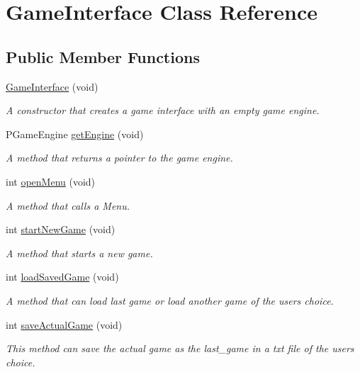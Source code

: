 \hypertarget{classGameInterface}{}\section{Game\+Interface Class Reference}
\label{classGameInterface}
\subsection*{Public Member Functions}
\begin{DoxyCompactItemize}
\item 
\hyperlink{classGameInterface_ad0748386476db5289c6965ac34cb93e5}{Game\+Interface} (void)
\begin{DoxyCompactList}\small\item\em A constructor that creates a game interface with an empty game engine. \end{DoxyCompactList}\item 
P\+Game\+Engine \hyperlink{classGameInterface_a0d60098b2f94bb20efb20196904dc30b}{get\+Engine} (void)
\begin{DoxyCompactList}\small\item\em A method that returns a pointer to the game engine. \end{DoxyCompactList}\item 
int \hyperlink{classGameInterface_a19dc01c2f82f5140e56980f5c02a8f55}{open\+Menu} (void)
\begin{DoxyCompactList}\small\item\em A method that calls a Menu. \end{DoxyCompactList}\item 
int \hyperlink{classGameInterface_a8a65a71277e660b053441c6bccdd21b9}{start\+New\+Game} (void)
\begin{DoxyCompactList}\small\item\em A method that starts a new game. \end{DoxyCompactList}\item 
int \hyperlink{classGameInterface_a1fe1e9abc88b994338f22202dae74a29}{load\+Saved\+Game} (void)
\begin{DoxyCompactList}\small\item\em A method that can load last game or load another game of the user\textquotesingle{}s choice. \end{DoxyCompactList}\item 
int \hyperlink{classGameInterface_ae069b22415177addad2bd7999b9eb2d9}{save\+Actual\+Game} (void)
\begin{DoxyCompactList}\small\item\em This method can save the actual game as the last\+\_\+game in a txt file of the users choice. \end{DoxyCompactList}\item 

\end{DoxyCompactItemize}
